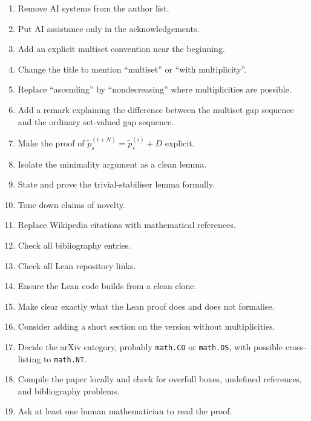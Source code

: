 \documentclass[11pt]{article}
\begin{document}
\begin{enumerate}
    \item Remove AI systems from the author list.

    \item Put AI assistance only in the acknowledgements.

    \item Add an explicit multiset convention near the beginning.

    \item Change the title to mention ``multiset'' or ``with multiplicity''.

    \item Replace ``ascending'' by ``nondecreasing'' where multiplicities are
    possible.

    \item Add a remark explaining the difference between the multiset gap
    sequence and the ordinary set-valued gap sequence.

    \item Make the proof of \(\tilde p_s^{(i+N)}=\tilde p_s^{(i)}+D\)
    explicit.

    \item Isolate the minimality argument as a clean lemma.

    \item State and prove the trivial-stabiliser lemma formally.

    \item Tone down claims of novelty.

    \item Replace Wikipedia citations with mathematical references.

    \item Check all bibliography entries.

    \item Check all Lean repository links.

    \item Ensure the Lean code builds from a clean clone.

    \item Make clear exactly what the Lean proof does and does not formalise.

    \item Consider adding a short section on the version without
    multiplicities.

    \item Decide the arXiv category, probably \texttt{math.CO} or
    \texttt{math.DS}, with possible cross-listing to \texttt{math.NT}.

    \item Compile the paper locally and check for overfull boxes,
    undefined references, and bibliography problems.

    \item Ask at least one human mathematician to read the proof.
\end{enumerate}
\end{document}
